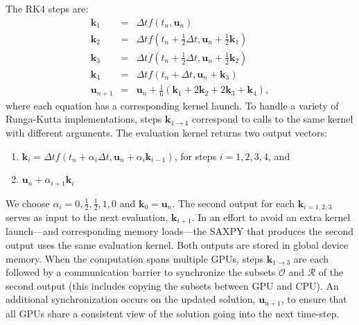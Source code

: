 \documentclass{report}
\begin{document}
The RK4 steps are: 
\begin{eqnarray} 
\mathbf{k}_1 &=& \Delta t f(t_n, \mathbf{u}_n) \nonumber \\
\mathbf{k}_2 &=& \Delta t f(t_n+\frac{1}{2}\Delta t, \mathbf{u}_n + \frac{1}{2}\mathbf{k}_1) \nonumber \\
\mathbf{k}_3 &=& \Delta t f(t_n+\frac{1}{2}\Delta t, \mathbf{u}_n + \frac{1}{2}\mathbf{k}_2)  \label{eqn:rk4}\\
\mathbf{k}_4 &=& \Delta t f(t_n+\Delta t, \mathbf{u}_n + \mathbf{k}_3) \nonumber \\
\mathbf{u}_{n+1} &=& \mathbf{u}_{n} + \frac{1}{6}(\mathbf{k}_1 + 2\mathbf{k}_2 + 2\mathbf{k}_3 +\mathbf{k}_4), \nonumber
\end{eqnarray}
where each equation has a corresponding kernel launch. To handle a variety of Runga-Kutta implementations, steps $\mathbf{k}_{1\rightarrow4}$ correspond to calls to the same kernel with different arguments. The evaluation kernel returns two output vectors: 
\begin{enumerate} 
\item $\mathbf{k}_i = \Delta t f(t_n + \alpha_{i} \Delta t, \mathbf{u}_n + \alpha_{i} \mathbf{k}_{i-1})$, for steps $i=1,2,3,4$, and
\item  $\mathbf{u}_n + \alpha_{i+1} \mathbf{k}_i$
\end{enumerate} 
We choose $\alpha_{i}=0, \frac{1}{2}, \frac{1}{2}, 1, 0$ and $\mathbf{k}_{0} = \mathbf{u}_n$. The second output for each $\mathbf{k}_{i=1,2,3}$ serves as input to the next evaluation, $\mathbf{k}_{i+1}$. In an effort to avoid an extra kernel launch---and corresponding memory loads---the SAXPY that produces the second output uses the same evaluation kernel. Both outputs are stored in global device memory. When the computation spans multiple GPUs, steps $\mathbf{k}_{1\rightarrow3}$ are each followed by a communication barrier to synchronize the subsets $\mathcal{O}$ and $\mathcal{R}$ of the second output (this includes copying the subsets between GPU and CPU). An additional synchronization occurs on the updated solution, $\mathbf{u}_{n+1}$, to ensure that all GPUs share a consistent view of the solution going into the next time-step.
\end{document}
